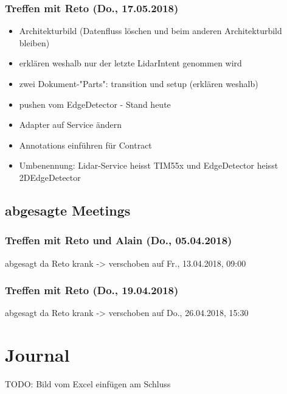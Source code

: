 \subsubsection{Treffen mit Reto (Do., 17.05.2018)}
\begin{itemize}
	\item Architekturbild (Datenfluss löschen und beim anderen Architekturbild bleiben)
	\item erklären weshalb nur der letzte LidarIntent genommen wird
	\item zwei Dokument-"Parts": transition und setup (erklären weshalb)
	\item pushen vom EdgeDetector - Stand heute
	\item Adapter auf Service ändern
	\item Annotations einführen für Contract
	\item Umbenennung: Lidar-Service heisst TIM55x und EdgeDetector heisst 2DEdgeDetector
\end{itemize}



\subsection{abgesagte Meetings}
\subsubsection{Treffen mit Reto und Alain (Do., 05.04.2018)}
abgesagt da Reto krank -> verschoben auf Fr., 13.04.2018, 09:00

\subsubsection{Treffen mit Reto (Do., 19.04.2018)}
abgesagt da Reto krank -> verschoben auf Do., 26.04.2018, 15:30

\section{Journal}
TODO: Bild vom Excel einfügen am Schluss